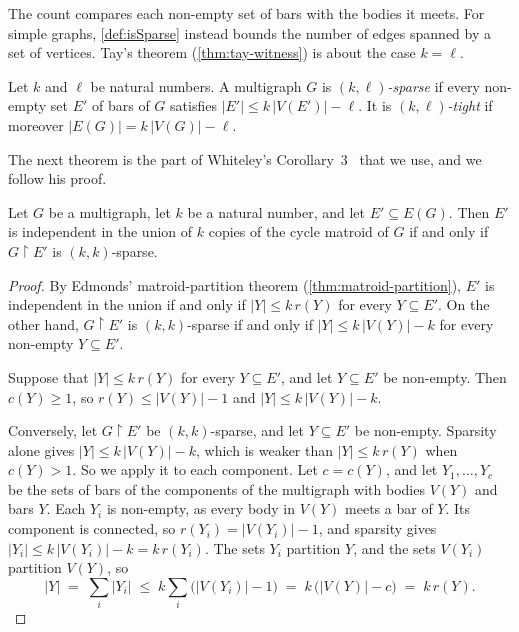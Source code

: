 The count compares each non-empty set of bars with the bodies it meets.
For simple graphs, \cref{def:isSparse} instead bounds the number of
edges spanned by a set of vertices. Tay's theorem
(\cref{thm:tay-witness}) is about the case $k = \ell$.

\begin{definition}
  \label{def:graph-sparse}
  \leanok
  Let $k$ and $\ell$ be natural numbers. A multigraph $G$ is
  \emph{$(k, \ell)$-sparse} if every non-empty set $E'$ of bars of $G$
  satisfies $|E'| \le k\,|V(E')| - \ell$. It is
  \emph{$(k, \ell)$-tight} if moreover $|E(G)| = k\,|V(G)| - \ell$.
\end{definition}

The next theorem is the part of Whiteley's
Corollary~3~\cite{whiteley1988} that we use, and we follow his proof.

\begin{theorem}
  \label{thm:unionPow-cycle-indep-iff-sparse}
  \leanok
  Let $G$ be a multigraph, let $k$ be a natural number, and let
  $E' \subseteq E(G)$. Then $E'$ is independent in the union of $k$
  copies of the cycle matroid of $G$ if and only if
  $G \restriction E'$ is $(k, k)$-sparse.
\end{theorem}
\begin{proof}
  \leanok
  By Edmonds' matroid-partition theorem
  (\cref{thm:matroid-partition}),
  $E'$ is independent in the union if and only if $|Y| \le k\, r(Y)$
  for every $Y \subseteq E'$. On the other hand, $G \restriction E'$ is
  $(k, k)$-sparse if and only if $|Y| \le k\,|V(Y)| - k$ for every
  non-empty $Y \subseteq E'$.

  Suppose that $|Y| \le k\, r(Y)$ for every $Y \subseteq E'$, and let
  $Y \subseteq E'$ be non-empty. Then $c(Y) \ge 1$, so
  $r(Y) \le |V(Y)| - 1$ and $|Y| \le k\,|V(Y)| - k$.

  Conversely, let $G \restriction E'$ be $(k, k)$-sparse, and let
  $Y \subseteq E'$ be non-empty. Sparsity alone gives
  $|Y| \le k\,|V(Y)| - k$, which is weaker than $|Y| \le k\, r(Y)$ when
  $c(Y) > 1$. So we apply it to each component. Let $c = c(Y)$, and let
  $Y_1, \dots, Y_c$ be the sets of bars of the components of the
  multigraph with bodies $V(Y)$ and bars $Y$. Each $Y_i$ is non-empty,
  as every body in $V(Y)$ meets a bar of $Y$. Its component is
  connected, so $r(Y_i) = |V(Y_i)| - 1$, and sparsity gives
  $|Y_i| \le k\,|V(Y_i)| - k = k\, r(Y_i)$.
  The sets $Y_i$ partition $Y$, and the sets $V(Y_i)$ partition
  $V(Y)$, so
  \[
    |Y| \;=\; \sum_{i} |Y_i| \;\le\; k \sum_{i} \bigl(|V(Y_i)| - 1\bigr)
    \;=\; k\,\bigl(|V(Y)| - c\bigr) \;=\; k\, r(Y).
  \]
\end{proof}

